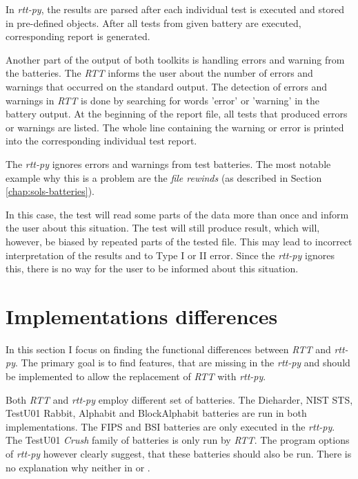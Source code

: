 \documentclass[
  digital,     %
  oneside,     %
  nosansbold,  %
  nocolorbold, %
  nolof,         %
  nolot,         %
]{fithesis4}
\begin{document}
In \emph{rtt-py}, the results are parsed after each individual test is executed and stored in pre-defined objects. After all tests from given battery are executed, corresponding report is generated.

Another part of the output of both toolkits is handling errors and warning from the batteries. The \emph{RTT} informs the user about the number of errors and warnings that occurred on the standard output. The detection of errors and warnings in \emph{RTT} is done by searching for words 'error' or 'warning' in the battery output. At the beginning of the report file, all tests that produced errors or warnings are listed. The whole line containing the warning or error is printed into the corresponding individual test report.

The \emph{rtt-py} ignores errors and warnings from test batteries. The most notable example why this is a problem are the \emph{file rewinds} (as described in Section \ref{chap:sols-batteries}).

In this case, the test will read some parts of the data more than once and inform the user about this situation. The test will still produce result, which will, however, be biased by repeated parts of the tested file. This may lead to incorrect interpretation of the results and to Type I or II error. Since the \emph{rtt-py} ignores this, there is no way for the user to be informed about this situation.
 


\section{Implementations differences}
In this section I focus on finding the functional differences between \emph{RTT} and \emph{rtt-py}. The primary goal is to find features, that are missing in the \emph{rtt-py} and should be implemented to allow the replacement of \emph{RTT} with \emph{rtt-py}. 




Both \emph{RTT} and \emph{rtt-py} employ different set of batteries. The Dieharder, NIST STS, TestU01 Rabbit, Alphabit and BlockAlphabit batteries are run in both implementations. The FIPS and BSI batteries are only executed in the \emph{rtt-py}. The TestU01 \emph{Crush} family of batteries is only run by \emph{RTT}. The program options of \emph{rtt-py} however clearly suggest, that these batteries should also be run. There is no explanation why neither in \cite{vavercak} or \cite{rtt-py-site}.
\end{document}
